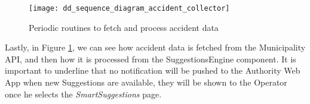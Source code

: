 \begin{figure}[ht]
    \centering
    \texttt{[image: dd\_sequence\_diagram\_accident\_collector]}
    \caption{Periodic routines to fetch and process accident data}
    \label{fig:dd_sequence_diagram_accident_collector}
\end{figure}

Lastly, in Figure \ref{fig:dd_sequence_diagram_accident_collector}, we can see
how accident data is fetched from the Municipality API, and then how it is
processed from the SuggestionsEngine component. It is important to underline
that no notification will be pushed to the Authority Web App when new
Suggestions are available, they will be shown to the Operator once he selects
the \emph{SmartSuggestions} page.

